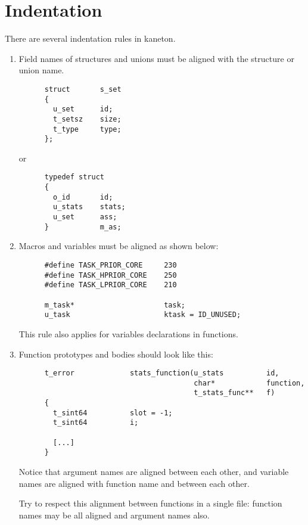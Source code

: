 %
%

\section{Indentation}

There are several indentation rules in kaneton.

\begin{enumerate}
  \item
    Field names of structures and unions must be aligned with the
    structure or union name.

    \begin{verbatim}
      struct       s_set
      {
        u_set      id;
        t_setsz    size;
        t_type     type;
      };
    \end{verbatim}

    or

    \begin{verbatim}
      typedef struct
      {
        o_id       id;
        u_stats    stats;
        u_set      ass;
      }            m_as;
    \end{verbatim}
  \item
    Macros and variables must be aligned as shown below:

    \begin{verbatim}
      #define TASK_PRIOR_CORE     230
      #define TASK_HPRIOR_CORE    250
      #define TASK_LPRIOR_CORE    210

      m_task*                     task;
      u_task                      ktask = ID_UNUSED;
    \end{verbatim}

    This rule also applies for variables declarations in functions.
  \item
    Function prototypes and bodies should look like this:

    \begin{verbatim}
      t_error             stats_function(u_stats          id,
                                         char*            function,
                                         t_stats_func**   f)
      {
        t_sint64          slot = -1;
        t_sint64          i;

        [...]
      }
    \end{verbatim}

    Notice that argument names are aligned between each other,
    and variable names are aligned with function name and between
    each other.

    Try to respect this alignment between functions in a single file:
    function names may be all aligned and argument names also.
\end{enumerate}

